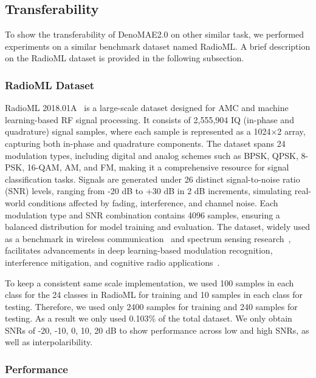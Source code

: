 \subsection{Transferability}

To show the transferability of DenoMAE2.0 on other similar task, we performed experiments on a similar benchmark dataset named RadioML. A brief description on the RadioML dataset is provided in the following subsection.

\subsubsection{RadioML Dataset}

RadioML 2018.01A~\cite{o2018over} is a large-scale dataset designed for AMC and machine learning-based RF signal processing. It consists of 2,555,904 IQ (in-phase and quadrature) signal samples, where each sample is represented as a 1024×2 array, capturing both in-phase and quadrature components. The dataset spans 24 modulation types, including digital and analog schemes such as BPSK, QPSK, 8-PSK, 16-QAM, AM, and FM, making it a comprehensive resource for signal classification tasks. Signals are generated under 26 distinct signal-to-noise ratio (SNR) levels, ranging from -20 dB to +30 dB in 2 dB increments, simulating real-world conditions affected by fading, interference, and channel noise. Each modulation type and SNR combination contains 4096 samples, ensuring a balanced distribution for model training and evaluation. The dataset, widely used as a benchmark in wireless communication~\cite{ccamlibel2024automatic} and spectrum sensing research~\cite{elyousseph2021deep}, facilitates advancements in deep learning-based modulation recognition, interference mitigation, and cognitive radio applications~\cite{cheng2024automatic, jagatheesaperumal2024deep, 10014805}.

To keep a consistent same scale implementation, we used 100 samples in each class for the 24 classes in RadioML for training and 10 samples in each class for testing. Therefore, we used only 2400 samples for training and 240 samples for testing. As a result we only used 0.103\% of the total dataset. We only obtain SNRs of -20, -10, 0, 10, 20 dB to show performance across low and high SNRs, as well as interpolaribility. 

\subsubsection{Performance}

